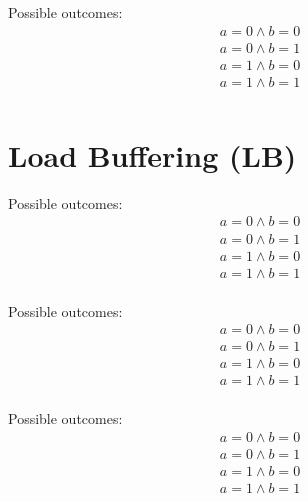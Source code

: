 \begin{minipage}[t]{0.3\linewidth}
Possible outcomes:\\
\[\begin{array}{l}
a = 0 \land b = 0\\
a = 0 \land b = 1\\
a = 1 \land b = 0\\
a = 1 \land b = 1\\
\end{array}\]
\end{minipage}
%
\sbTemplate{\sco}{\sco}{\sco}{\acq}{\sco}{\sco}
\litmusTestEnd


\section{Load Buffering (LB)}
\label{app:lb}

\begin{minipage}[t]{0.3\linewidth}
Possible outcomes:\\
\[\begin{array}{l}
a = 0 \land b = 0\\
a = 0 \land b = 1\\
a = 1 \land b = 0\\
a = 1 \land b = 1\\
\end{array}\]
\end{minipage}
%
\lbTemplate{\rlx}{\rlx}{\rlx}{\rlx}{\rlx}{\rlx}
\litmusTestEnd

\begin{minipage}[t]{0.3\linewidth}
Possible outcomes:\\
\[\begin{array}{l}
a = 0 \land b = 0\\
a = 0 \land b = 1\\
a = 1 \land b = 0\\
a = 1 \land b = 1\\
\end{array}\]
\end{minipage}
%
\lbTemplate{\rlx}{\rlx}{\rlx}{\rel}{\rlx}{\rel}
\litmusTestEnd

\begin{minipage}[t]{0.3\linewidth}
Possible outcomes:\\
\[\begin{array}{l}
a = 0 \land b = 0\\
a = 0 \land b = 1\\
a = 1 \land b = 0\\
a = 1 \land b = 1\\
\end{array}\]
\end{minipage}
%
\lbTemplate{\rlx}{\rlx}{\acq}{\rlx}{\acq}{\rlx}

